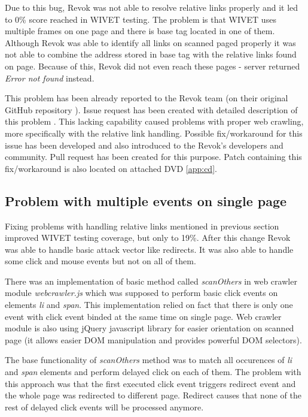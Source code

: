 		Due to this bug, Revok was not able to resolve relative links properly and it led to 0\% score reached in WIVET testing. The problem is that WIVET uses multiple frames on one page and there is base tag located in one of them. Although Revok was able to identify all links on scanned paged properly it was not able to combine the address stored in base tag with the relative links found on page. Because of this, Revok did not even reach these pages - server returned \textit{Error not found} instead.	
	
		This problem has been already reported to the Revok team (on their original GitHub repository \cite{Revok}). Issue request has been created with detailed description of this problem \cite{GitHubIssue1}. This lacking capability caused problems with proper web crawling, more specifically with the relative link handling. Possible fix/workaround for this issue has been developed and also introduced to the Revok's developers and community. Pull request \cite{GitHubPullRequest1} has been created for this purpose. Patch containing this fix/workaround is also located on attached DVD \ref{app:cd}.
	
		\subsection{Problem with multiple events on single page}\label{crawler-problem-2}
		
		Fixing problems with handling relative links mentioned in previous section improved WIVET testing coverage, but only to 19\%. After this change Revok was able to handle basic attack vector like redirects. It was also able to handle some click and mouse events but not on all of them. 
		
		There was an implementation of basic method called \textit{scanOthers} in web crawler module \textit{webcrawler.js} which was supposed to perform basic click events on elements \textit{li} and \textit{span}. This implementation relied on fact that there is only one event with click event binded at the same time on single page. Web crawler module is also using jQuery \cite{jquery} javascript library for easier orientation on scanned page (it allows easier DOM manipulation and provides powerful DOM selectors). 
		
		The base functionality of \textit{scanOthers} method was to match all occurences of \textit{li} and \textit{span} elements and perform delayed click on each of them. The problem with this approach was that the first executed click event triggers redirect event and the whole page was redirected to different page. Redirect causes that none of the rest of delayed click events will be processed anymore.
		

